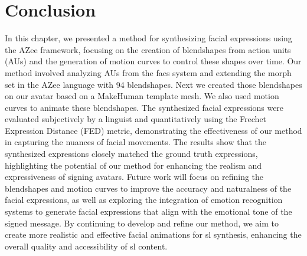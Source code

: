 \documentclass[../../main]{subfiles}
\begin{document}
\section{Conclusion}
\label{ch:facial_expressions:conclusion}

In this chapter, we presented a method for synthesizing facial expressions using the AZee framework, focusing on the creation of blendshapes from action units (AUs) and the generation of motion curves to control these shapes over time. Our method involved analyzing AUs from the \gls{facs} system and extending the morph set in the AZee language with 94 blendshapes. Next we created those blendshapes on our avatar based on a MakeHuman template mesh. We also used motion curves to animate these blendshapes. The synthesized facial expressions were evaluated subjectively by a linguist and quantitatively using the Frechet Expression Distance (FED) metric, demonstrating the effectiveness of our method in capturing the nuances of facial movements. The results show that the synthesized expressions closely matched the ground truth expressions, highlighting the potential of our method for enhancing the realism and expressiveness of signing avatars. Future work will focus on refining the blendshapes and motion curves to improve the accuracy and naturalness of the facial expressions, as well as exploring the integration of emotion recognition systems to generate facial expressions that align with the emotional tone of the signed message. By continuing to develop and refine our method, we aim to create more realistic and effective facial animations for \gls{sl} synthesis, enhancing the overall quality and accessibility of \gls{sl} content.
\end{document}
